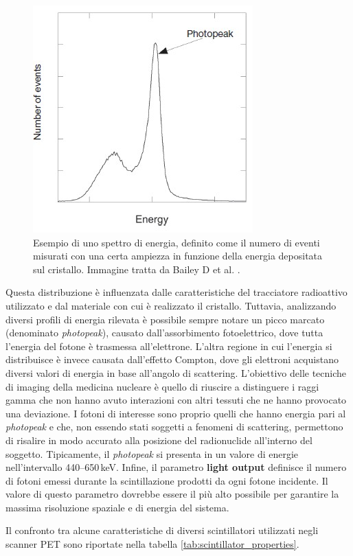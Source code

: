 \begin{figure}[h!]
	\centering
	\includegraphics[width=0.38\linewidth]{./ImageFiles/Photo peak.jpg}
	\caption{Esempio di uno spettro di energia, definito come il numero di eventi misurati con una certa ampiezza in funzione della energia depositata sul cristallo. Immagine tratta da Bailey D et al. \cite{Bailey2014}.}
	\label{fig:photo_peak}
\end{figure}
Questa distribuzione è influenzata dalle caratteristiche del tracciatore radioattivo utilizzato e dal materiale con cui è realizzato il cristallo. Tuttavia, analizzando diversi profili di energia rilevata è possibile sempre notare un picco marcato (denominato \textit{photopeak}), causato dall'assorbimento fotoelettrico, dove tutta l'energia del fotone è trasmessa all'elettrone. L'altra regione in cui l'energia si distribuisce è invece causata dall'effetto Compton, dove gli elettroni acquistano diversi valori di energia in base all'angolo di scattering. L'obiettivo delle tecniche di imaging della medicina nucleare è quello di riuscire a distinguere i raggi gamma che non hanno avuto interazioni con altri tessuti che ne hanno provocato una deviazione. I fotoni di interesse sono proprio quelli che hanno energia pari al \textit{photopeak} e che, non essendo stati soggetti a fenomeni di scattering, permettono di risalire in modo accurato alla posizione del radionuclide all'interno del soggetto. Tipicamente, il \textit{photopeak} si presenta in un valore di energie nell'intervallo \numrange[range-phrase=--]{440}{650}\,\unit{\kilo\electronvolt}. Infine, il parametro \textbf{light output} definisce il numero di fotoni emessi durante la scintillazione prodotti da ogni fotone incidente. Il valore di questo parametro dovrebbe essere il più alto possibile per garantire la massima risoluzione spaziale e di energia del sistema.

\noindent
Il confronto tra alcune caratteristiche di diversi scintillatori utilizzati negli scanner PET sono riportate nella tabella \ref{tab:scintillator_properties}.

